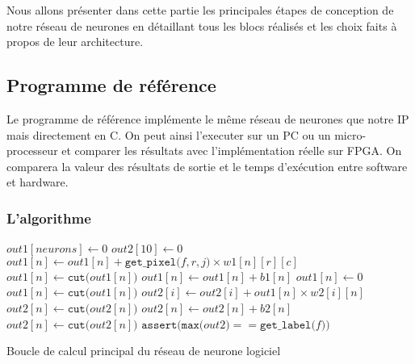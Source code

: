 
Nous allons présenter dans cette partie les principales étapes de conception
de notre réseau de neurones en détaillant tous les blocs réalisés et les choix
faits à propos de leur architecture.

\subsection{Programme de référence}
Le programme de référence implémente le même réseau de neurones que notre IP
mais directement en C. On peut ainsi l'executer sur un PC ou un micro-processeur 
et comparer les résultats avec l'implémentation réelle sur FPGA. On comparera
la valeur des résultats de sortie et le temps d'exécution entre software et
hardware.

\subsubsection{L'algorithme}

\begin{algorithm}
	\SetAlgoLined
	 {
		$out1[neurons] \leftarrow 0$\;
		$out2[10] \leftarrow 0$\;
		 {
			 {
				 {
					$out1[n] \leftarrow out1[n] + \texttt{get\_pixel(}f, r, j\texttt{)} \times w1[n][r][c]$\;
				}
			}
		}
		 {
			$out1[n] \leftarrow \texttt{cut(}out1[n]\texttt{)}$\;
			$out1[n] \leftarrow out1[n] + b1[n]$\;
			 {
				$out1[n] \leftarrow 0$\;
			}
			$out1[n] \leftarrow \texttt{cut(}out1[n]\texttt{)}$\;
		}
		 {
			 {
				$out2[i] \leftarrow out2[i] + out1[n] \times w2[i][n]$\;
			}
		}
		 {
			$out2[n] \leftarrow \texttt{cut(}out2[n]\texttt{)}$\;
			$out2[n] \leftarrow out2[n] + b2[n]$\;
			$out2[n] \leftarrow \texttt{cut(}out2[n]\texttt{)}$\;
		}
		$\texttt{assert(max(}out2\texttt{)} == \texttt{get\_label(}f\texttt{))}$\;
	}
	\caption{Boucle de calcul principal du réseau de neurone logiciel}
	\label{fig:soft_nn}
\end{algorithm}

